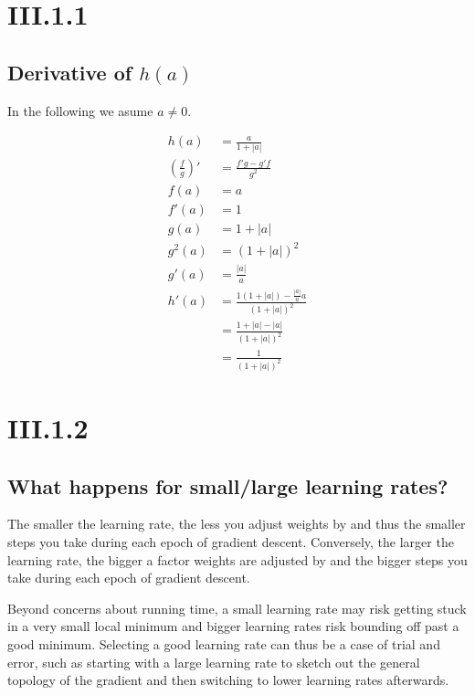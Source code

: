\section*{III.1.1}
\subsection*{Derivative of $h(a)$}
In the following we asume $a\neq0$.

\begin{align*}
  h(a) &= \frac{a}{1 + |a|} \\
  \left(\frac{f}{g}\right)' &= \frac{f'g - g'f}{g^2} \\
  f(a) &= a \\
  f'(a) &= 1 \\
  g(a) &= 1 + |a| \\
  g^2(a) &= (1 + |a|)^2 \\
  g'(a) &= \frac{|a|}{a} \\
  h'(a) &= \frac{1(1 + |a|) - \frac{|a|}{a}a}{(1 + |a|)^2} \\
        &= \frac{1 + |a| - |a|}{(1 + |a|)^2} \\
        &= \frac{1}{(1 + |a|)^2}
\end{align*}

\section*{III.1.2}
\subsection*{What happens for small/large learning rates?}
The smaller the learning rate, the less you adjust weights by and thus the smaller
steps you take during each epoch of gradient descent. Conversely, the larger the learning rate, 
the bigger a factor weights are adjusted by and the bigger steps you take during each epoch of
gradient descent.

Beyond concerns about running time, a small learning rate may risk getting stuck in a very small
local minimum and bigger learning rates risk bounding off past a good minimum. Selecting a good
learning rate can thus be a case of trial and error, such as starting with a large learning rate
to sketch out the general topology of the gradient and then switching to lower learning rates
afterwards.

